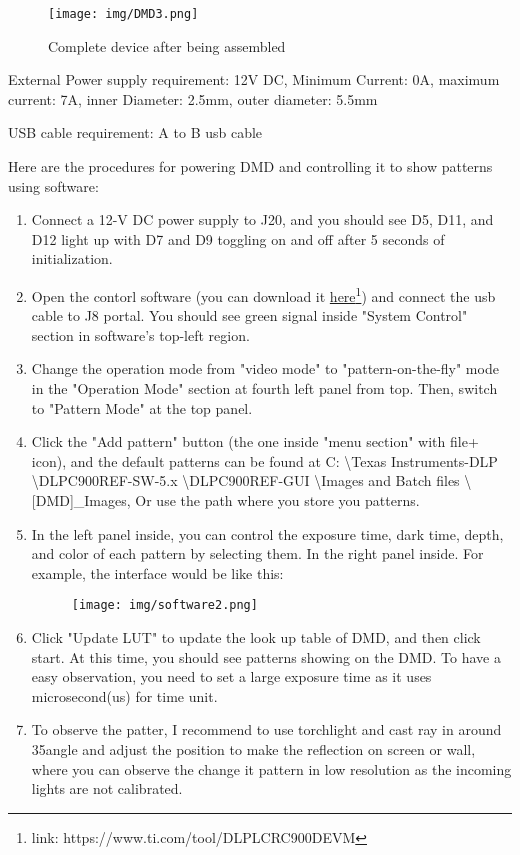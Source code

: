\documentclass[10pt,journal,compsoc]{IEEEtran}
\begin{document}
\begin{figure}[!h]
    \centering
    \texttt{[image: img/DMD3.png]}
    \caption{Complete device after being assembled}
    \label{fig:fig14}
\end{figure}
External Power supply requirement: 12V DC, Minimum Current: 0A, maximum current: 7A, inner Diameter: 2.5mm, outer diameter: 5.5mm

USB cable requirement: A to B usb cable

Here are the procedures for powering DMD and controlling it to show patterns using software:
\begin{enumerate}
    \item Connect a 12-V DC power supply to J20, and you should see D5, D11, and D12 light up with D7 and D9 toggling on and off after 5 seconds of initialization.
    \item Open the contorl software (you can download it \href{https://www.ti.com/tool/DLPLCRC900DEVM}{here}\footnote{link: https://www.ti.com/tool/DLPLCRC900DEVM}) and connect the usb cable to J8 portal. You should see green signal inside "System Control" section in software's top-left region.
    \item Change the operation mode from "video mode" to "pattern-on-the-fly" mode in the "Operation Mode" section at fourth left panel from top. Then, switch to "Pattern Mode" at the top panel.
    \item Click the "Add pattern" button (the one inside "menu section" with file+ icon), and the default patterns can be found at C: \textbackslash Texas Instruments-DLP \textbackslash DLPC900REF-SW-5.x \textbackslash DLPC900REF-GUI \textbackslash Images and Batch files \textbackslash [DMD]\_Images, Or use the path where you store you patterns.
    \item In the left panel inside, you can control the exposure time, dark time, depth, and color of each pattern by selecting them. In the right panel inside. For example, the interface would be like this:
    \begin{figure}[!h]
    \centering
    \texttt{[image: img/software2.png]}
    \label{fig:fig15}
    \end{figure}
    \item Click "Update LUT" to update the look up table of DMD, and then click start. At this time, you should see patterns showing on the DMD. To have a easy observation, you need to set a large exposure time as it uses microsecond(us) for time unit.
    \item To observe the patter, I recommend to use torchlight and cast ray in around 35\textdegree angle and adjust the position to make the reflection on screen or wall, where you can observe the change it pattern in low resolution as the incoming lights are not calibrated.
\end{enumerate}
\end{document}
